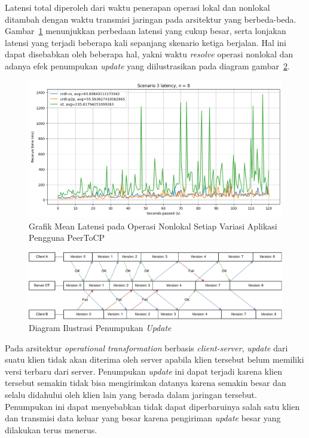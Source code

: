 Latensi total diperoleh dari waktu penerapan operasi lokal dan nonlokal ditambah dengan waktu transmisi jaringan pada arsitektur yang berbeda-beda. Gambar~\ref{fig:7-5} menunjukkan perbedaan latensi yang cukup besar, serta lonjakan latensi yang terjadi beberapa kali sepanjang skenario ketiga berjalan. Hal ini dapat disebabkan oleh beberapa hal, yakni waktu \textit{resolve} operasi nonlokal dan adanya efek penumpukan \textit{update} yang diilustrasikan pada diagram gambar~\ref{diagram:snowball}.

\begin{figure}
 \centering
 \includegraphics[width=15cm]{./assets/skripsi/benchmark-vis_cell_7_output_5}
 \caption{Grafik Mean Latensi pada Operasi Nonlokal Setiap Variasi Aplikasi Pengguna PeerToCP}
 \label{fig:7-5}
\end{figure}

\begin{figure}
 \centering
 \includegraphics[width=15cm]{./assets/skripsi/Snowball}
 \caption{Diagram Ilustrasi Penumpukan \textit{Update}}
 \label{diagram:snowball}
\end{figure}

Pada arsitektur \textit{operational transformation} berbasis \textit{client-server}, \textit{update} dari suatu klien tidak akan diterima oleh server apabila klien tersebut belum memiliki versi terbaru dari server. Penumpukan \textit{update} ini dapat terjadi karena klien tersebut semakin tidak bisa mengirimkan datanya karena semakin besar dan selalu didahului oleh klien lain yang berada dalam jaringan tersebut. Penumpukan ini dapat menyebabkan tidak dapat diperbaruinya salah satu klien dan transmisi data keluar yang besar karena pengiriman \textit{update} besar yang dilakukan terus menerus.

